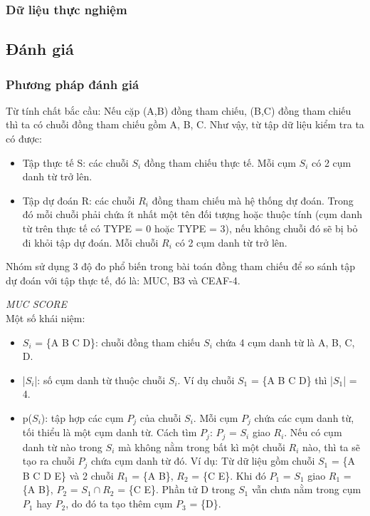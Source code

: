 \documentclass[12pt]{extarticle}
\begin{document}
			\subsubsection*{Dữ liệu thực nghiệm}

			\subsection{Đánh giá}			
				\subsubsection*{Phương pháp đánh giá}
					\par Từ tính chất bắc cầu: Nếu cặp (A,B) đồng tham chiếu, (B,C) đồng  tham chiếu thì ta có chuỗi đồng tham chiếu gồm A, B, C. Như vậy, từ tập dữ liệu kiểm tra ta có được:
						\begin{itemize}
					 		\item{Tập thực tế S: các chuỗi $S_i$ đồng tham chiếu thực tế. Mỗi cụm $S_i$ có 2 cụm danh từ trở lên.}				
							\item{Tập dự đoán R: các chuỗi $R_i$ đồng tham chiếu mà hệ thống dự đoán. Trong đó mỗi chuỗi phải chứa ít nhất một tên đối tượng hoặc thuộc tính (cụm danh từ trên thực tế có TYPE = 0 hoặc TYPE = 3), nếu không chuỗi đó sẽ bị bỏ đi khỏi tập dự đoán. Mỗi chuỗi $R_i$ có 2 cụm danh từ trở lên.}
						\end{itemize}
					\par Nhóm sử dụng 3 độ đo phổ biến trong bài toán đồng tham chiếu để so sánh tập dự đoán với tập thực tế, đó là: MUC, B3 và CEAF-4.
					\par \textit{MUC SCORE}
					\\Một số khái niệm:
						\begin{itemize}
							\item{$S_i$ = \{A B C D\}: chuỗi đồng tham chiếu $S_i$ chứa 4 cụm danh từ là A, B, C, D.}
							\item{|$S_i$|: số cụm danh từ thuộc chuỗi $S_i$. Ví dụ chuỗi $S_1$ = \{A B C D\} thì |$S_1$| = 4.}
							\item{p($S_i$): tập hợp các cụm $P_j$ của chuỗi $S_i$. Mỗi cụm $P_j$ chứa các cụm danh từ, tối thiểu là một cụm danh từ. Cách tìm $P_j$: $P_j$ = $S_i$ giao $R_i$. Nếu có cụm danh từ nào trong $S_i$ mà không nằm trong bất kì một chuỗi $R_i$ nào, thì ta sẽ tạo ra chuỗi $P_j$ chứa cụm danh từ đó. Ví dụ: Từ dữ liệu gồm chuỗi $S_1$ = \{A B C D E\} và 2 chuỗi $R_1$ = \{A B\}, $R_2$ = \{C E\}. Khi đó $P_1$ = $S_1$ giao $R_1$ = \{A B\}, $P_2$ = $S_1 \cap R_2$ = \{C E\}. Phần tử D trong $S_1$ vẫn chưa nằm trong cụm $P_1$ hay $P_2$, do đó ta tạo thêm cụm $P_3$ = \{D\}.}
						\end{itemize}								
\end{document}
